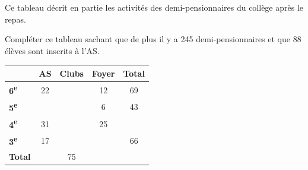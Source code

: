 \documentclass[a4paper]{book}
\begin{document}
    \begin{exercice}
        \begin{minipage}{0.5\linewidth}
            Ce tableau décrit en partie les activités des demi-pensionnaires du collège après le repas.        
    
             Compléter ce tableau  sachant que de plus il y a 245 demi-pensionnaires et que 88 élèves sont inscrits à l'AS.
        \end{minipage}
        \hfill
        \begin{minipage}{0.49\linewidth}
            \begin{center}
                \begin{tabular}{l|c|c|c|c}
                    \toprule
                     & \textbf{AS} & \textbf{Clubs} & \textbf{Foyer} & \textbf{Total} \\
                    \midrule
                    \textbf{6\textsuperscript{e}} & 22 & & 12 & 69 \\ \hline
                    \textbf{5\textsuperscript{e}} & & & 6 & 43 \\ \hline
                    \textbf{4\textsuperscript{e}} & 31 & & 25 & \\ \hline
                    \textbf{3\textsuperscript{e}} & 17 & & & 66 \\ 
                    \midrule
                    \textbf{Total} & & 75 & & \\
                    \bottomrule
                \end{tabular}
            \end{center}
        \end{minipage}       
    \end{exercice}
\end{document}
